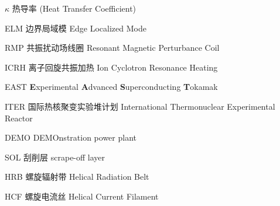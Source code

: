 \begin{denotation}[3cm]
\item[$\kappa$] 热导率 (Heat Transfer Coefficient)
\item[ELM] 边界局域模 Edge Localized Mode
\item[RMP] 共振扰动场线圈 Resonant Magnetic Perturbance Coil 
\item[ICRH] 离子回旋共振加热 Ion Cyclotron Resonance Heating  
\item[EAST] \textbf{E}xperimental \textbf{A}dvanced \textbf{S}uperconducting \textbf{T}okamak
\item[ITER] 国际热核聚变实验堆计划 International Thermonuclear Experimental Reactor 
\item[DEMO] DEMOnstration power plant
\item[SOL] 刮削层 scrape-off layer
\item[HRB] 螺旋辐射带 Helical Radiation Belt  
\item[HCF] 螺旋电流丝 Helical Current Filament
\end{denotation}





